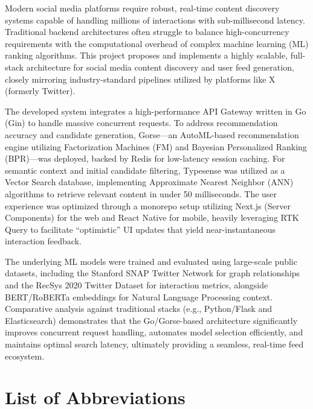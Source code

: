 \documentclass[12pt,a4paper]{report}
\begin{document}
\begingroup
\fontsize{11pt}{13.2pt}\selectfont
Modern social media platforms require robust, real-time content discovery systems capable of handling millions of interactions with sub-millisecond latency. Traditional backend architectures often struggle to balance high-concurrency requirements with the computational overhead of complex machine learning (ML) ranking algorithms. This project proposes and implements a highly scalable, full-stack architecture for social media content discovery and user feed generation, closely mirroring industry-standard pipelines utilized by platforms like X (formerly Twitter).

The developed system integrates a high-performance API Gateway written in Go (Gin) to handle massive concurrent requests. To address recommendation accuracy and candidate generation, Gorse---an AutoML-based recommendation engine utilizing Factorization Machines (FM) and Bayesian Personalized Ranking (BPR)---was deployed, backed by Redis for low-latency session caching. For semantic context and initial candidate filtering, Typesense was utilized as a Vector Search database, implementing Approximate Nearest Neighbor (ANN) algorithms to retrieve relevant content in under 50 milliseconds. The user experience was optimized through a monorepo setup utilizing Next.js (Server Components) for the web and React Native for mobile, heavily leveraging RTK Query to facilitate ``optimistic'' UI updates that yield near-instantaneous interaction feedback.

The underlying ML models were trained and evaluated using large-scale public datasets, including the Stanford SNAP Twitter Network for graph relationships and the RecSys 2020 Twitter Dataset for interaction metrics, alongside BERT/RoBERTa embeddings for Natural Language Processing context. Comparative analysis against traditional stacks (e.g., Python/Flask and Elasticsearch) demonstrates that the Go/Gorse-based architecture significantly improves concurrent request handling, automates model selection efficiently, and maintains optimal search latency, ultimately providing a seamless, real-time feed ecosystem.
\par\endgroup

\listoftables
\listoffigures
\tableofcontents

\chapter*{List of Abbreviations}
\end{document}
